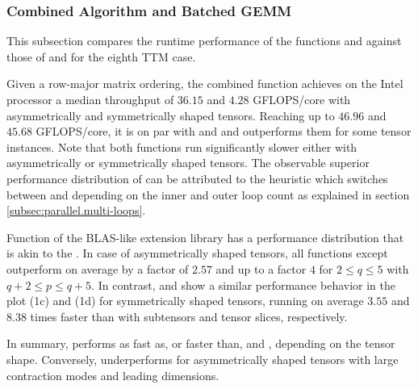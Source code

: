 \subsubsection{Combined Algorithm and Batched GEMM}
This subsection compares the runtime performance of the functions  and  against those of  and  for the eighth TTM case.

Given a row-major matrix ordering, the combined function  achieves on the Intel processor a median throughput of $36.15$ and $4.28$ GFLOPS/core with asymmetrically and symmetrically shaped tensors.
Reaching up to $46.96$ and $45.68$ GFLOPS/core, it is on par with  and  and outperforms them for some tensor instances.
Note that both functions run significantly slower either with asymmetrically or symmetrically shaped tensors.
The observable superior performance distribution of  can be attributed to the heuristic which switches between  and  depending on the inner and outer loop count as explained in section \ref{subsec:parallel.multi-loops}.

Function  of the BLAS-like extension library has a performance distribution that is akin to the .
In case of asymmetrically shaped tensors, all functions except  outperform  on average by a factor of $2.57$ and up to a factor $4$ for $2 \leq q\leq5$ with $q+2 \leq p \leq q+5$. %
In contrast,  and  show a similar performance behavior in the plot (1c) and (1d) for symmetrically shaped tensors, running on average $3.55$ and $8.38$ times faster than  with subtensors and tensor slices, respectively.

In summary,  performs as fast as, or faster than,  and , depending on the tensor shape. 
Conversely,  underperforms for asymmetrically shaped tensors with large contraction modes and leading dimensions.

